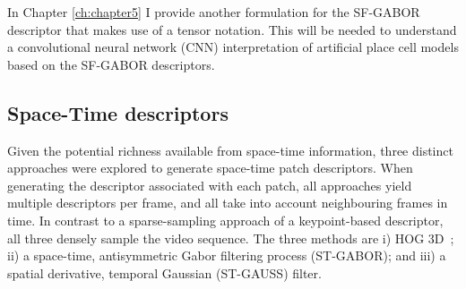 In Chapter \ref{ch:chapter5} I provide another formulation for the SF-GABOR descriptor that makes use of a tensor notation. This will be needed to understand a convolutional neural network (CNN) interpretation of artificial place cell models based on the SF-GABOR descriptors.

\subsection{Space-Time descriptors}

Given the potential richness available from space-time information, three distinct approaches were explored to generate space-time patch descriptors.  When generating the descriptor associated with each patch, all  approaches yield multiple descriptors per frame, and all take into account neighbouring frames in time.  In contrast to a sparse-sampling approach of a keypoint-based descriptor, all three densely sample the video sequence.  The three methods are i) HOG 3D~\cite{Klaser2008}; ii) a space-time, antisymmetric Gabor filtering process (ST-GABOR); and iii) a spatial derivative, temporal Gaussian (ST-GAUSS) filter.

